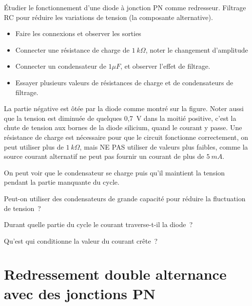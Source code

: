 \documentclass[a4paper,12pt,french]{sphinxmanual}
\let\sphinxpxdimen\pdfpxdimen\else\newdimen\sphinxpxdimen
\begin{document}
Étudier le fonctionnement d’une diode à jonction PN comme redresseur.
Filtrage RC pour réduire les variations de tension (la composante
alternative).

\noindent\sphinxincludegraphics[width=300\sphinxpxdimen]{{halfwave}.pdf}
\noindent\sphinxincludegraphics[width=300\sphinxpxdimen]{{halfwave}.pdf}

\begin{itemize}
\item {} 
Faire les connexions et observer les sorties

\item {} 
Connecter une résistance de charge de \(1~k\Omega\), noter le changement
d’amplitude

\item {} 
Connecter un condensateur de \(1 \mu F\),  et observer l’effet de filtrage.

\item {} 
Essayer plusieurs valeurs de résistances de charge et de
condensateurs de filtrage.

\end{itemize}


La partie négative est ôtée par la diode comme montré sur la figure.
Noter aussi que la tension est diminuée de quelques 0,7 V dans la moitié
positive, c’est la chute de tension aux bornes de la diode silicium,
quand le courant y passe. Une résistance de charge est nécessaire pour
que le circuit fonctionne correctement, on peut utiliser plus de
\(1~k\Omega\), mais NE PAS utiliser de valeurs plus faibles, comme la source
courant alternatif ne peut pas fournir un courant de plus de \(5~mA\).

On peut voir que le condensateur se charge puis qu’il maintient la
tension pendant la partie manquante du cycle.

Peut-on utiliser des condensateurs de grande capacité pour réduire la
fluctuation de tension ?

Durant quelle partie du cycle le courant traverse-t-il la diode ?

Qu’est qui conditionne la valeur du courant crête ?


\section{Redressement double alternance avec des jonctions PN}
\label{\detokenize{3.3:redressement-double-alternance-avec-des-jonctions-pn}}\label{\detokenize{3.3::doc}}
\end{document}
